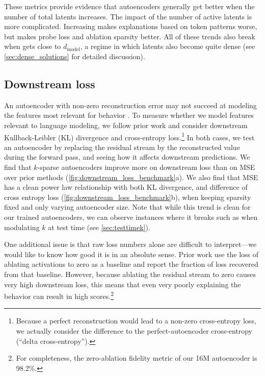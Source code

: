 These metrics provide evidence that autoencoders generally get better when the number of total latents increases.
The impact of the number of active latents \Lzero is more complicated.  Increasing \Lzero makes explanations based on token patterns worse, but makes probe loss and ablation sparsity better.  All of these trends also break when \Lzero gets close to $d_{\text{model}}$, a regime in which latents also become quite dense (see \autoref{sec:dense_solutions} for detailed discussion).




\subsection{Downstream loss}
\label{sec:downstream_loss}





An autoencoder with non-zero reconstruction error may not succeed at modeling the features most relevant for behavior \citep{braun2024identifying}.  
To measure whether we model features relevant to language modeling, we follow prior work \citep{bills2023language, cunningham2023sparse,bricken2023monosemanticity,braun2024identifying} and consider downstream Kullback-Leibler (KL) divergence and cross-entropy loss.\footnote{Because a perfect reconstruction would lead to a non-zero cross-entropy loss, we actually consider the difference to the perfect-autoencoder cross-entropy (``delta cross-entropy'').} In both cases, we test an autoencoder by replacing the residual stream by the reconstructed value during the forward pass, and seeing how it affects downstream predictions. %
We find that $k$-sparse autoencoders improve more on downstream loss than on MSE over prior methods (\autoref{fig:downstream_loss_benchmark}a).
We also find that MSE has a clean power law relationship with both KL divergence, and difference of cross entropy loss (\autoref{fig:downstream_loss_benchmark}b), when keeping sparsity \Lzero fixed and only varying autoencoder size. Note that while this trend is clean for our trained autoencoders, we can observe instances where it breaks such as when modulating $k$ at test time (see  \autoref{sec:testtimek}).  %




One additional issue is that raw loss numbers alone are difficult to interpret---we would like to know how good it is in an absolute sense. Prior work \citep{bricken2023monosemanticity,rajamanoharan2024improving} use the loss of ablating activations to zero as a baseline and report the fraction of loss recovered from that baseline. However, because ablating the residual stream to zero causes very high downstream loss, this means that even very poorly explaining the behavior can result in high scores.\footnote{For completeness, the zero-ablation fidelity metric of our 16M autoencoder is 98.2\%.}

